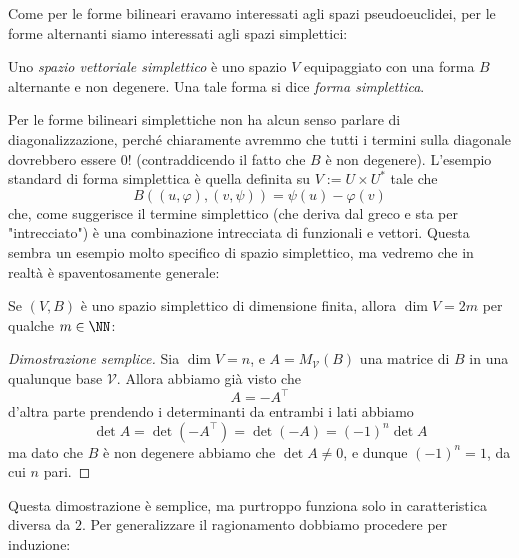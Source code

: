 \documentclass[11pt]{scrartcl}
\begin{document}
	Come per le forme bilineari eravamo interessati agli spazi pseudoeuclidei, per le forme alternanti siamo interessati agli spazi simplettici:
	\begin{definition}
		Uno \textit{spazio vettoriale simplettico} è uno spazio $V$ equipaggiato con una forma $B$ alternante e non degenere. Una tale forma si dice \textit{forma simplettica}.
	\end{definition}
	Per le forme bilineari simplettiche non ha alcun senso parlare di diagonalizzazione, perché chiaramente avremmo che tutti i termini sulla diagonale dovrebbero essere $0$! (contraddicendo il fatto che $B$ è non degenere). L'esempio standard di forma simplettica è quella definita su $V:=U\times U^*$ tale che
	$$B(\left(u,\varphi\right),\left(v,\psi\right))=\psi(u)-\varphi(v)$$
	che, come suggerisce il termine simplettico (che deriva dal greco e sta per "intrecciato") è una combinazione intrecciata di funzionali e vettori. Questa sembra un esempio molto specifico di spazio simplettico, ma vedremo che in realtà è spaventosamente generale:
	\begin{proposition}
		Se $(V,B)$ è uno spazio simplettico di dimensione finita, allora $\dim V = 2m$ per qualche $m\in\NN$:
	\end{proposition}
	\begin{proof}[Dimostrazione semplice]
		Sia $\dim V=n$, e $A=M_\mathcal{V}(B)$ una matrice di $B$ in una qualunque base $\mathcal{V}$. Allora abbiamo già visto che 
		$$A=-A^\intercal$$
		d'altra parte prendendo i determinanti da entrambi i lati abbiamo
		$$\det A = \det(-A^\intercal)=\det\left(-A\right)=\left(-1\right)^n\det A$$
		ma dato che $B$ è non degenere abbiamo che $\det A \ne 0$, e dunque $(-1)^n=1$, da cui $n$ pari.
	\end{proof}
	Questa dimostrazione è semplice, ma purtroppo funziona solo in caratteristica diversa da $2$. Per generalizzare il ragionamento dobbiamo procedere per induzione:
\end{document}
